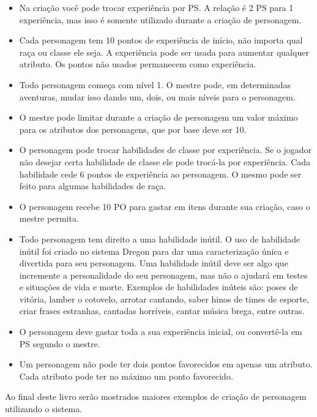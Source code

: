 \begin{itemize}
	\item Na criação você pode trocar experiência por PS. A relação é 2 PS para 1 experiência, mas isso é somente utilizado durante a criação de personagem.
	\item Cada personagem tem 10 pontos de experiência de início, não importa qual raça ou classe ele seja. A experiência pode ser usada para aumentar qualquer atributo. Os pontos não usados permanecem como experiência.
	\item Todo personagem começa com nível 1. O mestre pode, em determinadas aventuras, mudar isso dando um, dois, ou mais níveis para o personagem.
	\item O mestre pode limitar durante a criação de personagem um valor máximo para os atributos dos personagens, que por base deve ser 10.	
	\item O personagem pode trocar habilidades de classe por experiência. Se o jogador não desejar certa habilidade de classe ele pode trocá-la por experiência. Cada habilidade cede 6 pontos de experiência ao personagem. O mesmo pode ser feito para algumas habilidades de raça.
	\item O personagem recebe 10 PO para gastar em itens durante sua criação, caso o mestre permita.
	\item Todo personagem tem direito a uma habilidade inútil. O uso de habilidade inútil foi criado no sistema Dregon para dar uma caracterização única e divertida para seu personagem. Uma habilidade inútil deve ser algo que incremente a personalidade do seu personagem, mas não o ajudará em testes e situações de vida e morte. Exemplos de habilidades inúteis são: poses de vitória, lamber o cotovelo, arrotar cantando, saber hinos de times de esporte, criar frases estranhas, cantadas horríveis, cantar música brega, entre outras.
	\item O personagem deve gastar toda a sua experiência inicial, ou convertê-la em PS segundo o mestre.
	\item Um personagem não pode ter dois pontos favorecidos em apenas um atributo. Cada atributo pode ter no máximo um ponto favorecido.
\end{itemize}

Ao final deste livro serão mostrados maiores exemplos de criação de personagem utilizando o sistema.


